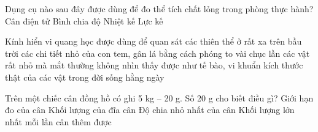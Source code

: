 \documentclass[FileMain.tex]{subfiles}
\begin{document}
\begin{ex}%
Dụng cụ nào sau đây được dùng để đo thể tích chất lỏng trong phòng thực hành?
\choice
{Cân điện tử}
{\True Bình chia độ}
{Nhiệt kế}
{Lực kế}
\end{ex}

\begin{ex}%
Kính hiển vi quang học được dùng để quan sát
\choice
{các thiên thể ở rất xa trên bầu trời}
{các chi tiết nhỏ của con tem, gân lá bằng cách phóng to vài chục lần}
{\True các vật rất nhỏ mà mắt thường không nhìn thấy được như tế bào, vi khuẩn}
{kích thước thật của các vật trong đời sống hằng ngày}
\end{ex}

\begin{ex}%
Trên một chiếc cân đồng hồ có ghi 5 kg -- 20 g. Số 20 g cho biết điều gì?
\choice
{Giới hạn đo của cân}
{Khối lượng của đĩa cân}
{\True Độ chia nhỏ nhất của cân}
{Khối lượng lớn nhất mỗi lần cân thêm được}
\end{ex}
\end{document}
